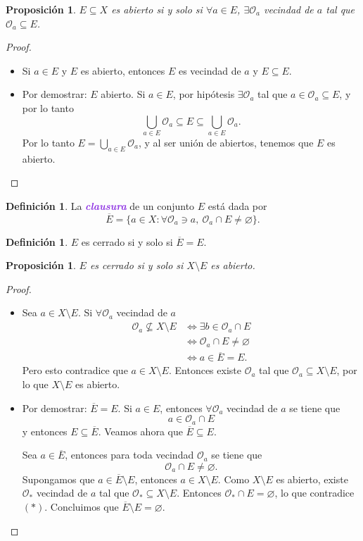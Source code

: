 \documentclass{article}
\newtheorem{proposition}[theorem]{Proposición}
\theoremstyle{definition}
\newtheorem{definition}[theorem]{Definición}
\theoremstyle{remark}
\numberwithin{equation}{section}
\renewcommand{\O}{\mathcal{O}}
\renewcommand{\bar}{\overline}
\newcommand{\ubseteq}{\subseteq}
\newcommand{\wea}[1]{\textcolor{BlueViolet}{\textbf{\emph{#1}}}}
\begin{document}
\begin{proposition}
  $E \ubseteq X$ es abierto si y solo si $\forall a \in E$, $\exists \O_a$ vecindad de $a$ tal que $\O_a \subseteq E$.
\end{proposition}
\begin{proof}\
  \begin{itemize}
    \item \boxed\implies
    Si $a \in E$ y $E$ es abierto, entonces $E$ es vecindad de $a$ y $E \subseteq E$. \checkmark
    \item \boxed\impliedby
    Por demostrar: $E$ abierto.
    Si $a \in E$, por hipótesis $\exists \O_a$ tal que $a \in \O_a \subseteq E$, y por lo tanto
    \[\bigcup_{a \in E} \O_a \subseteq E \subseteq \bigcup_{a \in E} \O_a.\]
    Por lo tanto $E = \bigcup_{a \in E} \O_a$, y al ser unión de abiertos, tenemos que $E$ es abierto.
  \end{itemize}
\end{proof}

\begin{definition}
  La \wea{clausura} de un conjunto $E$ está dada por
  \[\bar{E} = \{a \in X \colon \forall \O_a \ni a, \ \O_a \cap E \neq \varnothing\}.\]
\end{definition}

\begin{definition}
  $E$ es cerrado si y solo si $\bar{E} = E$.
\end{definition}

\begin{proposition}
  $E$ es cerrado si y solo si $X \setminus E$ es abierto.
\end{proposition}
\begin{proof}
  \
  \begin{itemize}
    \item \boxed{\implies} Sea $a \in X \setminus E$. Si $\forall \O_a$ vecindad de $a$
    \begin{align*}
      \O_a \not\subseteq X \setminus E
      &\iff \exists b \in \O_a \cap E \\
      &\iff \O_a \cap E \neq \varnothing \\
      &\iff a \in \bar E = E.
    \end{align*}
    Pero esto contradice que $a \in X \setminus E$. Entonces existe $\O_a$ tal que $\O_a \subseteq X \setminus E$, por lo que $X \setminus E$ es abierto.

    \item \boxed{\impliedby} Por demostrar: $\bar E = E$.
    Si $a \in E$, entonces $\forall \O_a$ vecindad de $a$ se tiene que $$a \in \O_a \cap E$$ y entonces $E \subseteq \bar E$. Veamos ahora que $\bar E \subseteq E$.

    Sea $a \in \bar E$, entonces para toda vecindad $\O_a$ se tiene que
    \[\O_a \cap E \neq \varnothing. \tag{$\ast$}\]
    Supongamos que $a \in \bar E \setminus E$, entonces $a \in X \setminus E$. Como $X \setminus E$ es abierto, existe $\O_*$ vecindad de $a$ tal que $\O_* \subseteq X \setminus E$. Entonces $\O_* \cap E = \varnothing$, lo que contradice $(*)$.
    Concluimos que $\bar E \setminus E = \varnothing$.
  \end{itemize}
\end{proof}
\end{document}

